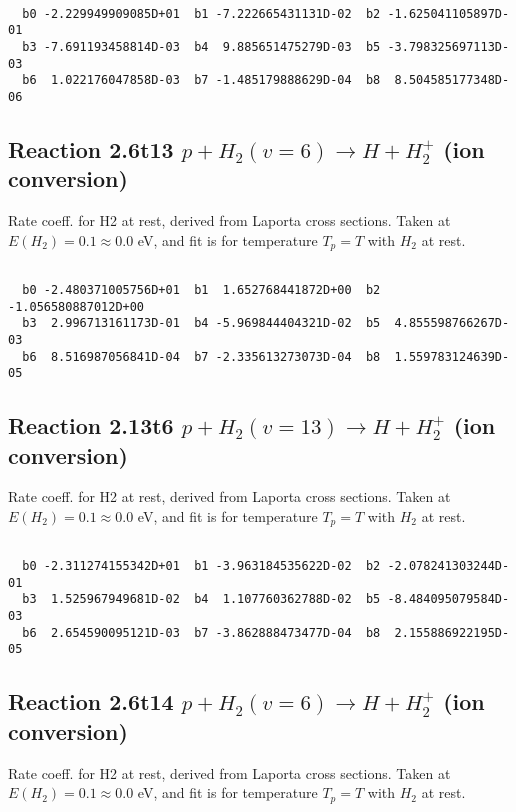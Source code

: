 \begin{small}\begin{verbatim}

  b0 -2.229949909085D+01  b1 -7.222665431131D-02  b2 -1.625041105897D-01
  b3 -7.691193458814D-03  b4  9.885651475279D-03  b5 -3.798325697113D-03
  b6  1.022176047858D-03  b7 -1.485179888629D-04  b8  8.504585177348D-06

\end{verbatim}\end{small}

\newpage
\subsection{
Reaction 2.6t13
$ p + H_2(v=6) \rightarrow H + H_2^+$ (ion conversion)
}
Rate coeff. for H2 at rest, derived from Laporta cross sections.
Taken at $E(H_2) = 0.1 \approx 0.0$ eV,  and fit is for temperature $T_p=T$ with $H_2$ at rest.

\begin{small}\begin{verbatim}

  b0 -2.480371005756D+01  b1  1.652768441872D+00  b2 -1.056580887012D+00
  b3  2.996713161173D-01  b4 -5.969844404321D-02  b5  4.855598766267D-03
  b6  8.516987056841D-04  b7 -2.335613273073D-04  b8  1.559783124639D-05

\end{verbatim}\end{small}

\newpage
\subsection{
Reaction 2.13t6
$ p + H_2(v=13) \rightarrow H + H_2^+$ (ion conversion)
}
Rate coeff. for H2 at rest, derived from Laporta cross sections.
Taken at $E(H_2) = 0.1 \approx 0.0$ eV,  and fit is for temperature $T_p=T$ with $H_2$ at rest.

\begin{small}\begin{verbatim}

  b0 -2.311274155342D+01  b1 -3.963184535622D-02  b2 -2.078241303244D-01
  b3  1.525967949681D-02  b4  1.107760362788D-02  b5 -8.484095079584D-03
  b6  2.654590095121D-03  b7 -3.862888473477D-04  b8  2.155886922195D-05

\end{verbatim}\end{small}

\newpage
\subsection{
Reaction 2.6t14
$ p + H_2(v=6) \rightarrow H + H_2^+$ (ion conversion)
}
Rate coeff. for H2 at rest, derived from Laporta cross sections.
Taken at $E(H_2) = 0.1 \approx 0.0$ eV,  and fit is for temperature $T_p=T$ with $H_2$ at rest.

